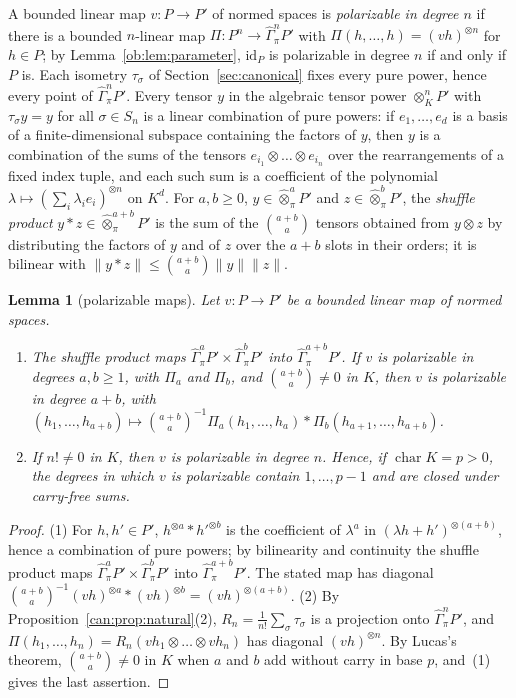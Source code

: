 \documentclass[11pt]{amsart}
\newtheorem{lemma}[theorem]{Lemma}
\theoremstyle{definition}
\theoremstyle{remark}
\numberwithin{equation}{section}
\newcommand{\id}{\mathrm{id}}
\newcommand{\norm}[1]{\lVert #1\rVert}
\theoremstyle{plain}
\theoremstyle{definition}
\theoremstyle{plain}
\newcommand{\hGamma}{\widehat\Gamma}
\begin{document}
A bounded linear map $v\colon P\to P'$ of normed spaces is \emph{polarizable in degree $n$} if there is a bounded
$n$-linear map $\Pi\colon P^n\to\hGamma^n_\pi P'$ with $\Pi(h,\dots,h)=(vh)^{\otimes n}$ for $h\in P$; by
Lemma~\ref{ob:lem:parameter}, $\id_P$ is polarizable in degree $n$ if and only if $P$ is. Each isometry $\tau_\sigma$ of
Section~\ref{sec:canonical} fixes every pure power, hence every point of $\hGamma^n_\pi P'$. Every tensor $y$ in the
algebraic tensor power $\otimes^n_KP'$ with $\tau_\sigma y=y$ for all $\sigma\in S_n$ is a linear combination of pure
powers: if $e_1,\dots,e_d$ is a basis of a finite-dimensional subspace containing the factors of $y$, then $y$ is a
combination of the sums of the tensors $e_{i_1}\otimes\dots\otimes e_{i_n}$ over the rearrangements of a fixed index tuple,
and each such sum is a coefficient of the polynomial $\lambda\mapsto(\sum_i\lambda_ie_i)^{\otimes n}$ on $K^d$. For
$a,b\ge0$, $y\in\widehat\otimes^a_\pi P'$ and $z\in\widehat\otimes^b_\pi P'$, the \emph{shuffle product}
$y*z\in\widehat\otimes^{a+b}_\pi P'$ is the sum of the $\binom{a+b}a$ tensors obtained from $y\otimes z$ by distributing the
factors of $y$ and of $z$ over the $a+b$ slots in their orders; it is bilinear with
$\norm{y*z}\le\binom{a+b}a\norm y\norm z$.

\begin{lemma}[polarizable maps]\label{dgr:lem:polarizable}
Let $v\colon P\to P'$ be a bounded linear map of normed spaces.
\begin{enumerate}
\item The shuffle product maps $\hGamma^a_\pi P'\times\hGamma^b_\pi P'$ into $\hGamma^{a+b}_\pi P'$. If $v$ is polarizable
in degrees $a,b\ge1$, with $\Pi_a$ and $\Pi_b$, and $\binom{a+b}a\ne0$ in $K$, then $v$ is polarizable in degree $a+b$, with
$(h_1,\dots,h_{a+b})\mapsto\binom{a+b}a^{-1}\Pi_a(h_1,\dots,h_a)*\Pi_b(h_{a+1},\dots,h_{a+b})$.
\item If $n!\ne0$ in $K$, then $v$ is polarizable in degree $n$. Hence, if $\operatorname{char}K=p>0$, the degrees in which
$v$ is polarizable contain $1,\dots,p-1$ and are closed under carry-free sums.
\end{enumerate}
\end{lemma}

\begin{proof}
(1) For $h,h'\in P'$, $h^{\otimes a}*h'^{\otimes b}$ is the coefficient of $\lambda^a$ in
$(\lambda h+h')^{\otimes(a+b)}$, hence a combination of pure powers; by bilinearity and continuity the shuffle product maps
$\hGamma^a_\pi P'\times\hGamma^b_\pi P'$ into $\hGamma^{a+b}_\pi P'$. The stated map has diagonal
$\binom{a+b}a^{-1}(vh)^{\otimes a}*(vh)^{\otimes b}=(vh)^{\otimes(a+b)}$. (2) By Proposition~\ref{can:prop:natural}(2),
$R_n=\frac1{n!}\sum_\sigma\tau_\sigma$ is a projection onto $\hGamma^n_\pi P'$, and
$\Pi(h_1,\dots,h_n)=R_n(vh_1\otimes\dots\otimes vh_n)$ has diagonal $(vh)^{\otimes n}$. By Lucas's theorem,
$\binom{a+b}a\ne0$ in $K$ when $a$ and $b$ add without carry in base $p$, and~(1) gives the last assertion.
\end{proof}
\end{document}
